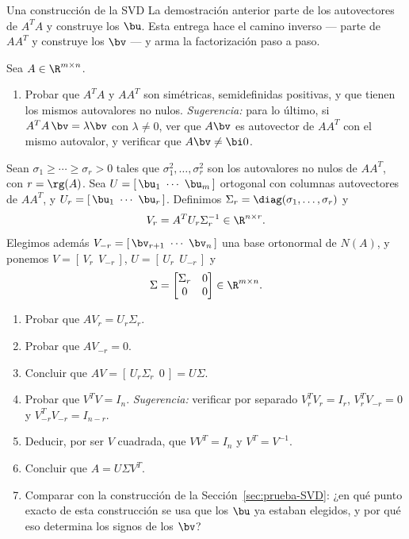 \begin{entrega}{Una construcción de la SVD}\label{ent:construccion-SVD}
La demostración anterior parte de los autovectores de $A^TA$ y construye los
$\bu$. Esta entrega hace el camino inverso --- parte de $AA^T$ y construye los
$\bv$ --- y arma la factorización paso a paso.

Sea $A\in\R^{m\times n}$.
\begin{enumerate}[label=\textbf{(\alph*)},itemsep=3pt,topsep=4pt]
\item Probar que $A^TA$ y $AA^T$ son simétricas, semidefinidas positivas, y
que tienen los mismos autovalores no nulos. \emph{Sugerencia:} para lo último,
si $A^TA\,\bv=\lambda\bv$ con $\lambda\neq0$, ver que $A\bv$ es autovector de
$AA^T$ con el mismo autovalor, y verificar que $A\bv\neq\bi 0$.
\end{enumerate}

\medskip
\noindent Sean $\sigma_1\ge\cdots\ge\sigma_r>0$ tales que
$\sigma_1^2,\dots,\sigma_r^2$ son los autovalores no nulos de $AA^T$, con
$r=\rg(A)$. Sea $U=[\,\bu_1\ \cdots\ \bu_m\,]$ ortogonal con columnas
autovectores de $AA^T$, y $U_r=[\,\bu_1\ \cdots\ \bu_r\,]$. Definimos
$\Sigma_r=\diag(\sigma_1,\dots,\sigma_r)$ y
\[
V_r=A^TU_r\Sigma_r^{-1}\in\R^{n\times r} .
\]
Elegimos además $V_{-r}=[\,\bv_{r+1}\ \cdots\ \bv_n\,]$ una base ortonormal de
$N(A)$, y ponemos $V=[\,V_r\ \ V_{-r}\,]$, $U=[\,U_r\ \ U_{-r}\,]$ y
\[
\Sigma=\begin{bmatrix}\Sigma_r&0\\ 0&0\end{bmatrix}\in\R^{m\times n} .
\]

\begin{enumerate}[label=\textbf{(\alph*)},itemsep=3pt,topsep=4pt,start=2]
\item Probar que $AV_r=U_r\Sigma_r$.
\item Probar que $AV_{-r}=0$.
\item Concluir que $AV=[\,U_r\Sigma_r\ \ 0\,]=U\Sigma$.
\item Probar que $V^TV=I_n$. \emph{Sugerencia:} verificar por separado
$V_r^TV_r=I_r$, $V_r^TV_{-r}=0$ y $V_{-r}^TV_{-r}=I_{n-r}$.
\item Deducir, por ser $V$ cuadrada, que $VV^T=I_n$ y $V^T=V^{-1}$.
\item Concluir que $A=U\Sigma V^T$.
\item Comparar con la construcción de la Sección~\ref{sec:prueba-SVD}: ¿en
qué punto exacto de esta construcción se usa que los $\bu$ ya estaban
elegidos, y por qué eso determina los signos de los $\bv$?
\end{enumerate}

\medskip
{}
\end{entrega}

